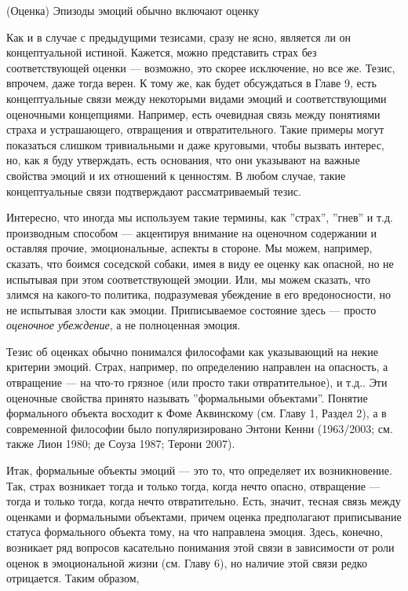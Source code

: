 \documentclass[11pt]{book}
\begin{document}
\smallskip

(Оценка) Эпизоды эмоций обычно включают оценку

\smallskip

Как и в случае с предыдущими тезисами, сразу не ясно, является ли он концептуальной истиной. Кажется, можно представить страх без соответствующей оценки --- возможно, это скорее исключение, но все же. Тезис, впрочем, даже тогда верен. К тому же, как будет обсуждаться в Главе 9, есть концептуальные связи между некоторыми видами эмоций и соответствующими оценочными концепциями. Например, есть очевидная связь между понятиями страха и устрашающего, отвращения и отвратительного. Такие примеры могут показаться слишком тривиальными и даже круговыми, чтобы вызвать интерес, но, как я буду утверждать, есть основания, что они указывают на важные свойства эмоций и их отношений к ценностям. В любом случае, такие концептуальные связи подтверждают рассматриваемый тезис.

Интересно, что иногда мы используем такие термины, как ''страх'', ''гнев'' и т.д. производным способом --- акцентируя внимание на оценочном содержании и оставляя прочие, эмоциональные, аспекты в стороне. Мы можем, например, сказать, что боимся соседской собаки, имея в виду ее оценку как опасной, но не испытывая при этом соответствующей эмоции. Или, мы можем сказать, что злимся на какого-то политика, подразумевая убеждение в его вредоносности, но не испытывая злости как эмоции. Приписываемое состояние здесь --- просто \textit{оценочное убеждение}, а не полноценная эмоция.

Тезис об оценках обычно понимался философами как указывающий на некие критерии эмоций. Страх, например, по определению направлен на опасность, а отвращение --- на что-то грязное (или просто таки отвратительное), и т.д.. Эти оценочные свойства принято называть ''формальными объектами''. Понятие формального объекта восходит к Фоме Аквинскому (см. Главу 1, Раздел 2), а в современной философии было популяризировано Энтони Кенни (1963/2003; см. также Лион 1980; де Соуза 1987; Терони 2007).

Итак, формальные объекты эмоций --- это то, что определяет их возникновение. Так, страх возникает тогда и только тогда, когда нечто опасно, отвращение --- тогда и только тогда, когда нечто отвратительно. Есть, значит, тесная связь между оценками и формальными объектами, причем оценка предполагают приписывание статуса формального объекта тому, на что направлена эмоция. Здесь, конечно, возникает ряд вопросов касательно понимания этой связи в зависимости от роли оценок в эмоциональной жизни (см. Главу 6), но наличие этой связи редко отрицается. Таким образом,
\end{document}
